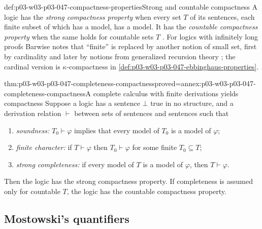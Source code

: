 \begin{hbdefinition}{def:p03-w03-p03-047-compactness-properties}{Strong and countable compactness}
A logic has the \emph{strong compactness property} when every set \(T\) of
its sentences, each finite subset of which has a model, has a model.  It has
the \emph{countable compactness property} when the same holds for countable
sets \(T\) \cite[Ch.~I, \S1.4, p.~7]{Barwise1985BackgroundAims}.  For logics with
infinitely long proofs Barwise notes that ``finite'' is replaced by another
notion of small set, first by cardinality and later by notions from
generalized recursion theory \cite[Ch.~I, \S1.4, p.~8]{Barwise1985BackgroundAims};
the cardinal version is \(\kappa\)-compactness in
\cref{def:p03-w03-p03-047-ebbinghaus-properties}.
\end{hbdefinition}

\begin{hbtheorem}{thm:p03-w03-p03-047-completeness-compactness}{proved=annex:p03-w03-p03-047-completeness-compactness}{A complete calculus with finite derivations yields compactness}
Suppose a logic has a sentence \(\bot\) true in no structure, and a derivation
relation \(\vdash\) between sets of sentences and sentences such that
\begin{enumerate}
 \item \emph{soundness:} \(T_0\vdash\varphi\) implies that every model of
       \(T_0\) is a model of \(\varphi\);
 \item \emph{finite character:} if \(T\vdash\varphi\) then
       \(T_0\vdash\varphi\) for some finite \(T_0\subseteq T\);
 \item \emph{strong completeness:} if every model of \(T\) is a model of
       \(\varphi\), then \(T\vdash\varphi\).
\end{enumerate}
Then the logic has the strong compactness property.  If completeness is
assumed only for countable \(T\), the logic has the countable compactness
property.
\end{hbtheorem}

\subsection{Mostowski's quantifiers}

